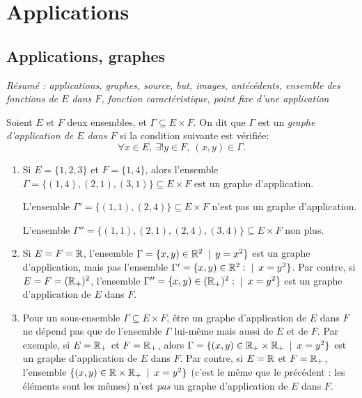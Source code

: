 \chapter{Applications}
\minitoc
\hyperlink{toc}{\retourTOC}


\section{Applications, graphes}

\emph{Résumé : applications, graphes, source, but, images, antécédents, ensemble des fonctions de $E$ dans $F$, fonction caractéristique, point fixe d'une application}

\begin{definition}\label{def-graphe}
Soient $E$ et $F$ deux ensembles, et $\Gamma \subseteq E\times F$. On dit que $\Gamma$ est un \emph{graphe d'application de $E$ dans $F$} si la condition suivante est vérifiée:
\[\forall x\in E, \: \exists! y\in F, \: (x,y) \in \Gamma.\]
\end{definition}

\begin{exemple}
\begin{enumerate}
\item Si $E = \{1,2,3\}$ et $F = \{1,4\}$, alors l'ensemble $\Gamma = \{(1,4),(2,1),(3,1)\} \subseteq E\times F$ est un graphe d'application.

L'ensemble $\Gamma' = \{(1,1),(2,4)\} \subseteq E\times F$ n'est pas un graphe d'application.

L'ensemble $\Gamma'' = \{(1,1),(2,1),(2,4),(3,4)\} \subseteq E\times F$ non plus.
\item Si $E = F = \mathbb{R}$, l'ensemble $\Gamma = \{x,y)\in \R^2 \:\mid\: y=x^2\}$ est un graphe d'application, mais pas l'ensemble $\Gamma' = \{x,y)\in \R^2 :\mid\: x=y^2\}$. Par contre, si $E=F=(\mathbb{R}_+)^2$, l'ensemble  $\Gamma'' = \{x,y)\in (\R_+)^2 :\mid\: x=y^2\}$ est un graphe d'application de $E$ dans $F$.
\item Pour un sous-ensemble $\Gamma\subseteq E\times F$, être un graphe d'application de $E$ dans $F$ ne dépend pas que de l'ensemble $\Gamma$ lui-même mais aussi de $E$ et de $F$. Par exemple, si $E=\mathbb{R}_+$ et $F=\mathbb{R}_+$, alors $\Gamma = \{(x,y)\in \R_+\times \R_+ \:\mid\: x=y^2\}$ est un graphe d'application de $E$ dans $F$. Par contre, si $E=\mathbb{R}$ et $F=\mathbb{R}_+$, l'ensemble $\{(x,y)\in \R\times \R_+ \:\mid\: x=y^2\}$ (c'est le même que le précédent : les éléments sont les mêmes) n'est \emph{pas} un graphe d'application de $E$ dans $F$.
\end{enumerate}
\end{exemple}

